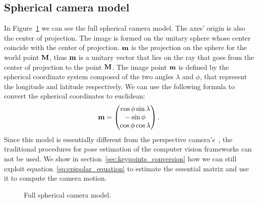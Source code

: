 \subsection{Spherical camera model}
\label{subsec:spherical_camera_model}
In Figure~\ref{fig:camera_model} we can see the full spherical camera model.
The axes' origin is also the center of projection. The image is formed on 
the unitary sphere whose center coincide with the center of projection.
$\mathbf{m}$ is the projection on the sphere for the world point 
$\mathbf{M}$, thus $\mathbf{m}$ is a unitary vector that lies on the ray that goes
from the center of projection to the point $\mathbf{M}$.
The image point $\mathbf{m}$ is defined by the spherical coordinate 
system composed of the two angles $\lambda$ and $\phi$, that represent the 
longitude and latitude respectively. 
We can use the following formula to convert the spherical coordinates to 
euclidean:
\begin{equation}
	\label{eq:ll2Cartesian_second}
	\mathbf{m} =
	\begin{pmatrix}
		\cos\phi\sin\lambda \\
		-\sin\phi \\
		\cos\phi\cos\lambda
	\end{pmatrix}	\text{.}
\end{equation}
Since this model is essentially different from the 
perspective camera's~\cite{szeliski2010computer}, the traditional procedures 
for pose estimation of the computer vision frameworks can not be used.
We show in section~\ref{sec:keypoints_conversion} how we can still exploit
equation~\ref{eq:epipolar_equation} to estimate the essential matrix and use it
to compute the camera motion.
\begin{figure}[h]
    \centering
    \def\svgwidth{0.7\columnwidth}
    
    \caption{Full spherical camera model.}
	\label{fig:camera_model}
\end{figure}

